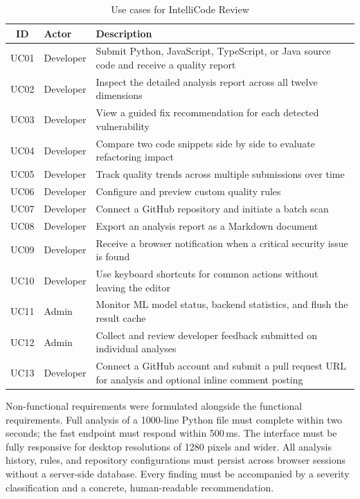 \documentclass[12pt, oneside]{report}
\begin{document}
\begin{table}[H]
\centering
\caption{Use cases for IntelliCode Review}
\label{tab:usecases}
\begin{tabular}{@{}clp{8.5cm}@{}}
\toprule
\textbf{ID} & \textbf{Actor} & \textbf{Description} \\
\midrule
UC01 & Developer & Submit Python, JavaScript, TypeScript, or Java source code and receive a quality report \\
UC02 & Developer & Inspect the detailed analysis report across all twelve dimensions \\
UC03 & Developer & View a guided fix recommendation for each detected vulnerability \\
UC04 & Developer & Compare two code snippets side by side to evaluate refactoring impact \\
UC05 & Developer & Track quality trends across multiple submissions over time \\
UC06 & Developer & Configure and preview custom quality rules \\
UC07 & Developer & Connect a GitHub repository and initiate a batch scan \\
UC08 & Developer & Export an analysis report as a Markdown document \\
UC09 & Developer & Receive a browser notification when a critical security issue is found \\
UC10 & Developer & Use keyboard shortcuts for common actions without leaving the editor \\
UC11 & Admin & Monitor ML model status, backend statistics, and flush the result cache \\
UC12 & Admin & Collect and review developer feedback submitted on individual analyses \\
UC13 & Developer & Connect a GitHub account and submit a pull request URL for analysis and optional inline comment posting \\
\bottomrule
\end{tabular}
\end{table}

Non-functional requirements were formulated alongside the functional requirements.
Full analysis of a 1000-line Python file must complete within two seconds; the fast
endpoint must respond within 500\,ms. The interface must be fully responsive for
desktop resolutions of 1280 pixels and wider. All analysis history, rules, and
repository configurations must persist across browser sessions without a server-side
database. Every finding must be accompanied by a severity classification and a
concrete, human-readable recommendation.
\end{document}
